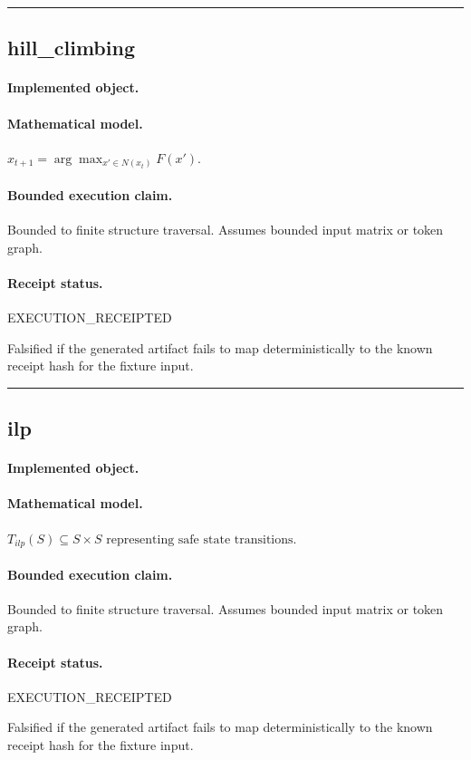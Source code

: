 \vspace{1em}\hrule\vspace{1em}
\subsection{hill\_climbing}
\paragraph{Implemented object.} 
\paragraph{Mathematical model.} $x_{t+1} = \arg\max_{x'\in N(x_t)} F(x').$
\paragraph{Bounded execution claim.} Bounded to finite structure traversal. Assumes bounded input matrix or token graph.
\paragraph{Receipt status.} EXECUTION\_RECEIPTED
\begin{falsifier}
Falsified if the generated artifact fails to map deterministically to the known receipt hash for the fixture input.
\end{falsifier}

\vspace{1em}\hrule\vspace{1em}
\subsection{ilp}
\paragraph{Implemented object.} 
\paragraph{Mathematical model.} $T_{ilp}(S) \subseteq S \times S \text{ representing safe state transitions}.$
\paragraph{Bounded execution claim.} Bounded to finite structure traversal. Assumes bounded input matrix or token graph.
\paragraph{Receipt status.} EXECUTION\_RECEIPTED
\begin{falsifier}
Falsified if the generated artifact fails to map deterministically to the known receipt hash for the fixture input.
\end{falsifier}

